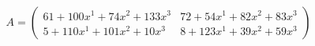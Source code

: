 \documentclass[preview]{standalone}
\begin{document}
\begin{align*}
A = \begin{pmatrix}61 + 100x^{1} + 74x^{2} + 133x^{3} & 72 + 54x^{1} + 82x^{2} + 83x^{3} \\ 5 + 110x^{1} + 101x^{2} + 10x^{3} & 8 + 123x^{1} + 39x^{2} + 59x^{3}\end{pmatrix}
\end{align*}
\end{document}
